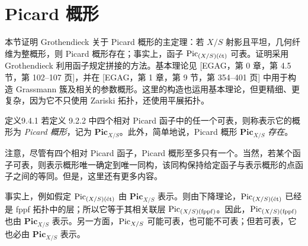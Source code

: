 \section{Picard 概形}
\label{ch09s04:section}
\begingroup
\def\PS{\mathbf{Pic}_{X/S}}
\def\PE{\Pic_{(X/S)(\text{\'et})}}
\def\PF{\Pic_{(X/S)(\mathrm{fppf})}}
\def\L{\mathcal L}\def\N{\mathcal N}\def\Q{\mathcal Q}\def\PP{\mathcal P}
本节证明 Grothendieck 关于 Picard 概形的主定理：若 $X/S$ 射影且平坦，几何纤维为整概形，则 Picard 概形存在；事实上，函子 $\PE$ 可表。证明采用 Grothendieck 利用函子规定拼接的方法。基本理论见 [EGAG，第 0 章，第 4.5 节，第 102--107 页]，并在 [EGAG，第 1 章，第 9 节，第 354--401 页] 中用于构造 Grassmann 簇及相关的参数概形。这里的构造也运用基本理论，但更精细、更复杂，因为它不只使用 Zariski 拓扑，还使用平展拓扑。

\begin{origstatement}{定义}{9.4.1}\label{ch09s04:9.4.1}
若定义 9.2.2 中四个相对 Picard 函子中的任一个可表，则称表示它的概形为 \emph{Picard 概形}，记为 $\PS$。此外，简单地说，Picard 概形 $\PS$ \emph{存在}。
\end{origstatement}
注意，尽管有四个相对 Picard 函子，Picard 概形至多只有一个。当然，若某个函子可表，则表示概形唯一确定到唯一同构，该同构保持给定函子与表示概形的点函子之间的等同。但是，这里还有更多内容。

事实上，例如假定 $\PE$ 由 $\PS$ 表示。则由下降理论，$\PE$ 已经是 fppf 拓扑中的层；所以它等于其相关联层 $\PF$。因此，$\PF$ 也由 $\PS$ 表示。另一方面，$\operatorname{Pic}_{X/S}$ 可能可表，也可能不可表；但若可表，它也必由 $\PS$ 表示。

